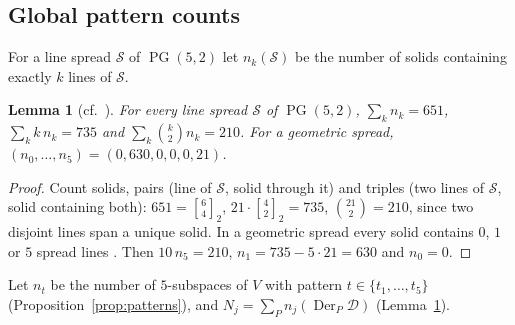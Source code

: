 \documentclass[11pt]{amsart}
\newtheorem{lemma}[theorem]{Lemma}
\theoremstyle{definition}
\newcommand{\gauss}[3]{\genfrac{[}{]}{0pt}{}{#1}{#2}_{#3}}
\newcommand{\D}{\mathcal{D}}
\newcommand{\PG}{\operatorname{PG}}
\newcommand{\Der}{\operatorname{Der}}
\begin{document}
\subsection{Global pattern counts}
For a line spread $\mathcal S$ of $\PG(5,2)$ let $n_k(\mathcal S)$ be the number of solids containing exactly $k$ lines of $\mathcal S$.

\begin{lemma}[cf.\ {\cite[Sect.~3.C]{MT09}}]\label{lem:ident}
For every line spread $\mathcal S$ of $\PG(5,2)$, $\sum_kn_k=651$, $\sum_kk\,n_k=735$ and $\sum_k\binom k2n_k=210$. For a geometric spread, $(n_0,\dots,n_5)=(0,630,0,0,0,21)$.
\end{lemma}
\begin{proof}
Count solids, pairs (line of $\mathcal S$, solid through it) and triples (two lines of $\mathcal S$, solid containing both): $651=\gauss642$, $21\cdot\gauss422=735$, $\binom{21}2=210$, since two disjoint lines span a unique solid. In a geometric spread every solid contains $0$, $1$ or $5$ spread lines \cite[Sect.~2.3]{Kie22}. Then $10\,n_5=210$, $n_1=735-5\cdot21=630$ and $n_0=0$.
\end{proof}

Let $n_t$ be the number of $5$-subspaces of $V$ with pattern $t\in\{t_1,\dots,t_5\}$ (Proposition~\ref{prop:patterns}), and $N_j=\sum_Pn_j(\Der_P\D)$ (Lemma~\ref{lem:ident}).
\end{document}
